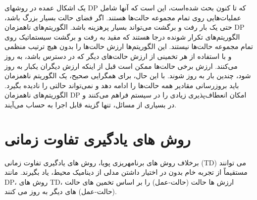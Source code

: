 %
%
%
یک اشکال عمده در روشهای DP که تا کنون بحث شده‌است، این است که آنها شامل عملیات‌هایی روی تمام مجموعه حالت‌ها هستند.
اگر فضای حالت بسیار بزرگ باشد،
حتی یک بار رفت و برگشت می‌تواند بسیار پرهزینه باشد.
الگوریتم‌های ناهمزمان DP الگوریتم‌های تکرار شونده درجا هستند که مقید به رفت و برگشت سیستماتیک روی تمام مجموعه حالت‌ها نیستند. این الگوریتم‌ها ارزش حالت‌ها را بدون هیچ ترتیب منظمی ‌و با استفاده از هر تخمینی از ارزش حالت‌های دیگر که در دسترس باشد، به روز می‌کنند.
 ارزش برخی حالت‌ها ممکن است قبل از اینکه ارزش دیگران یکبار به روز شود، چندین بار به روز شوند. با این حال، برای همگرایی صحیح، یک الگوریتم ناهمزمان باید بروزرسانی مقادیر همه حالت‌ها را ادامه دهد و نمی‌تواند حالتی را نادیده بگیرد.
الگوریتم‌های ناهمزمان DP امکان انعطاف‌پذیری زیادی را در سیستم فراهم می‌کنند و در بسیاری از مسائل، تنها گزینه قابل اجرا به حساب می‌آیند.

\section{روش های یادگیری تفاوت زمانی}
برخلاف روش های برنامه\nf ریزی پویا، روش های 
{یادگیری تفاوت زمانی} (TD) می توانند مستقیماً از تجربه خام بدون در اختیار داشتن مدلی از دینامیک محیط، یاد بگیرند. مانند DP، روش های TD، ارزش ها حالت  (حالت-عمل) را بر اساس تخمین های حالت (حالت-عمل)  های دیگر به روز می کنند.




